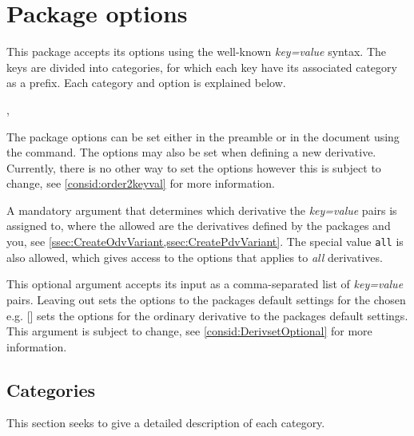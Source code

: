 \documentclass[final,british,10pt]{scrartcl}
\theoremstyle{remark}
\begin{document}
	\section{Package options}
	This package accepts its options using the well-known \emph{key=value} syntax. The keys are divided into categories, for which each key have its associated category as a prefix. Each category and option is explained below. 
	
	\begin{function}{\derivset}
		\begin{syntax}
			, 
		\end{syntax}
		The package options can be set either in the preamble or in the document using the  command. The options may also be set when defining a new derivative. Currently, there is no other way to set the options however this is subject to change, see \cref{consid:order2keyval} for more information.
		
		\begin{argument}{1}
			A mandatory argument that determines which derivative the \emph{key=value} pairs is assigned to, where the allowed  are the derivatives defined by the packages and you, see \cref{ssec:CreateOdvVariant,ssec:CreatePdvVariant}. The special value \texttt{all} is also allowed, which gives access to the options that applies to \textit{all} derivatives.
		\end{argument}
		
		\begin{argument}{2}
			This optional argument accepts its input as a comma-separated list of \emph{key=value} pairs. Leaving out  sets the options to the packages default settings for the chosen  e.g. \macro{\derivset}[\narg{\macro{\odv}}] sets the options for the ordinary derivative to the packages default settings. This argument is subject to change, see \cref{consid:DerivsetOptional} for more information.
		\end{argument}
	\end{function}
	
	\subsection{Categories}
	This section seeks to give a detailed description of each category.
	
\end{document}
